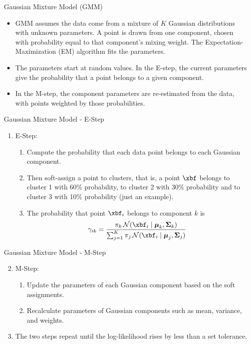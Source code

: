 \documentclass[aspectratio=169,xcolor=dvipsnames,svgnames,x11names,fleqn]{beamer}
\begin{document}
\begin{frame}{Gaussian Mixture Model (GMM)}
    \begin{itemize}
    \item GMM assumes the data come from a mixture of $K$ Gaussian distributions with unknown parameters. A point is drawn from one component, chosen with probability equal to that component's mixing weight. The Expectation-Maximization (EM) algorithm fits the parameters.
\item The parameters start at random values. In the E-step, the current parameters give the probability that a point belongs to a given component.
\item In the M-step, the component parameters are re-estimated from the data, with points weighted by those probabilities.
\end{itemize}
\end{frame}

\begin{frame}{Gaussian Mixture Model - E-Step}
    \begin{enumerate}
    \item E-Step:
    \begin{enumerate}
        \item Compute the probability that each data point belongs to each Gaussian component.
        \item Then soft-assign a point to clusters, that is, a point $\xbf$ belongs to cluster 1 with 60\% probability, to cluster 2 with 30\% probability and to cluster 3 with 10\% probability (just an example).
\item The probability that point $\xbf_i$ belongs to component $k$ is
\[
    \gamma_{ik} = \frac{\pi_k\,\mathcal{N}(\xbf_i \mid \boldsymbol{\mu}_k, \boldsymbol{\Sigma}_k)}{\sum_{j=1}^{K} \pi_j\,\mathcal{N}(\xbf_i \mid \boldsymbol{\mu}_j, \boldsymbol{\Sigma}_j)}
\]

    \end{enumerate}
\end{enumerate}
\end{frame}

\begin{frame}{Gaussian Mixture Model - M-Step}
    \begin{enumerate}
    \setcounter{enumi}{1}
    \item M-Step:
    \begin{enumerate}
        \item Update the parameters of each Gaussian component based on the soft assignments.
       \item Recalculate parameters of Gaussian components such as mean, variance, and weights.

    \end{enumerate}
\item The two steps repeat until the log-likelihood rises by less than a set tolerance.\end{enumerate}
\end{frame}
\end{document}
